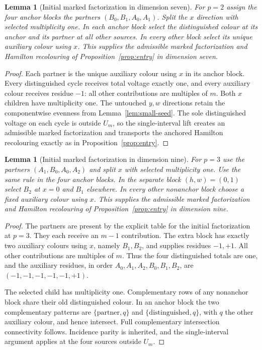 \documentclass[11pt,reqno]{amsart}
\numberwithin{equation}{section}
\newtheorem{lemma}[theorem]{Lemma}
\theoremstyle{definition}
\theoremstyle{remark}
\begin{document}
\begin{lemma}[Initial marked factorization in dimension seven]\label{lem:entry-seven}
For $p=2$ assign the four anchor blocks the partners
$(B_0,B_1,A_0,A_1)$. Split the $x$ direction with selected multiplicity one. In each
anchor block select the distinguished colour at its anchor and its partner at all other
sources. In every other block select its unique auxiliary colour using $x$.
This supplies the admissible marked factorization and Hamilton recolouring of
Proposition~\ref{prop:entry} in dimension seven.
\end{lemma}
\begin{proof}
Each partner is the unique auxiliary colour using $x$ in its anchor block. Every distinguished
cycle receives total voltage exactly one, and every auxiliary colour receives residue
$-1$: all other contributions are multiples of $m$. Both $x$ children have multiplicity
one. The untouched $y,w$ directions retain the componentwise evenness from
Lemma~\ref{lem:small-seed}. The sole distinguished voltage on each cycle is outside
$U_m$, so the single-interval lift creates an admissible marked factorization and transports the anchored
Hamilton recolouring exactly as in Proposition~\ref{prop:entry}.
\end{proof}

\begin{lemma}[Initial marked factorization in dimension nine]\label{lem:entry-nine}
For $p=3$ use the partners $(A_1,B_0,A_0,A_2)$ and split $x$ with selected
multiplicity one.
Use the same rule in the four anchor blocks. In the separate block
$(h,w)=(0,1)$ select $B_2$ at $x=0$ and $B_1$ elsewhere. In every other
nonanchor block choose a fixed auxiliary colour using $x$. This supplies the admissible marked factorization
and Hamilton recolouring of Proposition~\ref{prop:entry} in dimension nine.
\end{lemma}
\begin{proof}
The partners are present by the explicit table for the initial factorization at $p=3$. They each receive an
$m-1$ contribution. The extra block has exactly two auxiliary colours using $x$, namely $B_1,B_2$,
and supplies residues $-1,+1$. All other contributions are multiples of $m$.
Thus the four distinguished totals are one, and the auxiliary residues, in order
$A_0,A_1,A_2,B_0,B_1,B_2$, are $(-1,-1,-1,-1,-1,+1)$.

The selected child has multiplicity one. Complementary rows of any nonanchor block
share their old distinguished colour. In an anchor block the two complementary patterns
are $\{\text{partner},q\}$ and $\{\text{distinguished},q\}$, with $q$ the other auxiliary
colour, and hence intersect. Full complementary intersection connectivity follows. Incidence
parity is inherited, and the single-interval argument applies at the four sources
outside $U_m$.
\end{proof}
\end{document}
